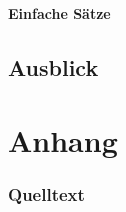 \documentclass[12pt,abstract=on,titlepage,bibliography=totoc,ngerman,listof=totoc]{scrreprt}
\begin{document}
\subsection{Einfache Sätze}
\label{subsec:einfachesaetze}
\pagebreak
\chapter{Ausblick}
\label{chap:ausblick}
\pagebreak
\clearpage
{}
\setcounter{page}{1}
%
\printbibliography
\pagebreak

\part{Anhang}
\label{part:anhang}
\section{Quelltext}
\label{sec:quelltext}
%
\end{document}
